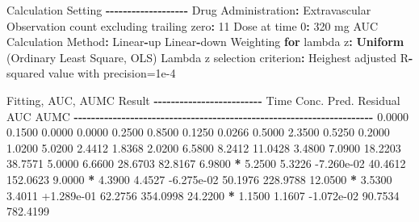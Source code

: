 \documentclass[
  10pt,
]{krantz}
\makeatletter
\newenvironment{Shaded}{\begin{snugshade}}{\end{snugshade}}
\newcommand{\ControlFlowTok}[1]{\textcolor[rgb]{0.13,0.29,0.53}{\textbf{#1}}}
\newcommand{\DecValTok}[1]{\textcolor[rgb]{0.00,0.00,0.81}{#1}}
\newcommand{\FloatTok}[1]{\textcolor[rgb]{0.00,0.00,0.81}{#1}}
\newcommand{\KeywordTok}[1]{\textcolor[rgb]{0.13,0.29,0.53}{\textbf{#1}}}
\newcommand{\NormalTok}[1]{#1}
\newcommand{\OperatorTok}[1]{\textcolor[rgb]{0.81,0.36,0.00}{\textbf{#1}}}
\newcommand{\StringTok}[1]{\textcolor[rgb]{0.31,0.60,0.02}{#1}}
\newenvironment{kframe}{%
\medskip{}
\setlength{\fboxsep}{.8em}
 \def\at@end@of@kframe{}%
 \ifinner\ifhmode%
  \def\at@end@of@kframe{\end{minipage}}%
  \begin{minipage}{\columnwidth}%
 \fi\fi%
 \def\FrameCommand##1{\hskip\@totalleftmargin \hskip-\fboxsep
 \colorbox{shadecolor}{##1}\hskip-\fboxsep
     \hskip-\linewidth \hskip-\@totalleftmargin \hskip\columnwidth}%
 \MakeFramed {\advance\hsize-\width
   \@totalleftmargin\z@ \linewidth\hsize
   \@setminipage}}%
 {\par\unskip\endMakeFramed%
 \at@end@of@kframe}
\renewenvironment{Shaded}{\begin{kframe}}{\end{kframe}}
\makeatother
\begin{document}
\begin{Shaded}
\begin{Highlighting}[]
\NormalTok{Calculation Setting}
\OperatorTok{{-}{-}{-}{-}{-}{-}{-}{-}{-}{-}{-}{-}{-}{-}{-}{-}{-}{-}{-}}
\NormalTok{Drug Administration}\OperatorTok{:}\StringTok{ }\NormalTok{Extravascular}
\NormalTok{Observation count excluding trailing zero}\OperatorTok{:}\StringTok{ }\DecValTok{11}
\NormalTok{Dose at time }\DecValTok{0}\OperatorTok{:}\StringTok{ }\DecValTok{320}\NormalTok{ mg}
\NormalTok{AUC Calculation Method}\OperatorTok{:}\StringTok{ }\NormalTok{Linear}\OperatorTok{{-}}\NormalTok{up Linear}\OperatorTok{{-}}\NormalTok{down}
\NormalTok{Weighting }\ControlFlowTok{for}\NormalTok{ lambda z}\OperatorTok{:}\StringTok{ }\KeywordTok{Uniform}\NormalTok{ (Ordinary Least Square, OLS)}
\NormalTok{Lambda z selection criterion}\OperatorTok{:}\StringTok{ }\NormalTok{Heighest adjusted R}\OperatorTok{{-}}\NormalTok{squared value with precision=}\FloatTok{1e{-}4}


\NormalTok{Fitting, AUC, AUMC Result}
\OperatorTok{{-}{-}{-}{-}{-}{-}{-}{-}{-}{-}{-}{-}{-}{-}{-}{-}{-}{-}{-}{-}{-}{-}{-}{-}{-}}
\StringTok{      }\NormalTok{Time         Conc.      Pred.   Residual       AUC       AUMC}
\OperatorTok{{-}{-}{-}{-}{-}{-}{-}{-}{-}{-}{-}{-}{-}{-}{-}{-}{-}{-}{-}{-}{-}{-}{-}{-}{-}{-}{-}{-}{-}{-}{-}{-}{-}{-}{-}{-}{-}{-}{-}{-}{-}{-}{-}{-}{-}{-}{-}{-}{-}{-}{-}{-}{-}{-}{-}{-}{-}{-}{-}{-}{-}{-}{-}{-}{-}{-}{-}{-}{-}}
\StringTok{     }\FloatTok{0.0000}       \FloatTok{0.1500}                           \FloatTok{0.0000}     \FloatTok{0.0000}
     \FloatTok{0.2500}       \FloatTok{0.8500}                           \FloatTok{0.1250}     \FloatTok{0.0266}
     \FloatTok{0.5000}       \FloatTok{2.3500}                           \FloatTok{0.5250}     \FloatTok{0.2000}
     \FloatTok{1.0200}       \FloatTok{5.0200}                           \FloatTok{2.4412}     \FloatTok{1.8368}
     \FloatTok{2.0200}       \FloatTok{6.5800}                           \FloatTok{8.2412}    \FloatTok{11.0428}
     \FloatTok{3.4800}       \FloatTok{7.0900}                          \FloatTok{18.2203}    \FloatTok{38.7571}
     \FloatTok{5.0000}       \FloatTok{6.6600}                          \FloatTok{28.6703}    \FloatTok{82.8167}
     \FloatTok{6.9800} \OperatorTok{*}\StringTok{     }\FloatTok{5.2500}     \FloatTok{5.3226} \FloatTok{{-}7.260e{-}02}    \FloatTok{40.4612}   \FloatTok{152.0623}
     \FloatTok{9.0000} \OperatorTok{*}\StringTok{     }\FloatTok{4.3900}     \FloatTok{4.4527} \FloatTok{{-}6.275e{-}02}    \FloatTok{50.1976}   \FloatTok{228.9788}
    \FloatTok{12.0500} \OperatorTok{*}\StringTok{     }\FloatTok{3.5300}     \FloatTok{3.4011} \FloatTok{+1.289e{-}01}    \FloatTok{62.2756}   \FloatTok{354.0998}
    \FloatTok{24.2200} \OperatorTok{*}\StringTok{     }\FloatTok{1.1500}     \FloatTok{1.1607} \FloatTok{{-}1.072e{-}02}    \FloatTok{90.7534}   \FloatTok{782.4199}


\end{Highlighting}
\end{Shaded}
\end{document}
